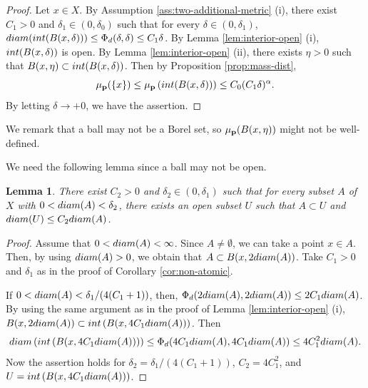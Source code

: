 \documentclass[10pt,a4paper]{amsart}
\newtheorem{Lem}[Thm]{Lemma}
\begin{document}
\begin{proof}
Let $x \in X$. 
By Assumption \ref{ass:two-additional-metric} (i), 
there exist $C_1 > 0$ and $\delta_1 \in (0, \delta_0)$ such that for every $\delta \in (0, \delta_1)$, 
$\textup{diam}(\textup{int}(B(x,\delta))) \le \Phi_d (\delta, \delta) \le C_1 \delta$. 
By Lemma \ref{lem:interior-open} (i), $\textup{int}(B(x,\delta))$ is open.
By Lemma \ref{lem:interior-open} (ii), there exists $\eta > 0$ such that $B(x,\eta) \subset \textup{int}(B(x,\delta))$. 
Then by Proposition \ref{prop:mass-dist}, 
\[ \mu_{\bf p}(\{x\}) \le \mu_{\bf p} \left( \textup{int}(B(x,\delta)) \right) \le C_0 (C_1 \delta)^{\alpha}.   \]
By letting $\delta \to +0$, we have the assertion. 
\end{proof}

We remark that a ball may not be a Borel set, so $\mu_{\bf p}(B(x,\eta))$ might not be well-defined. 

We need the following lemma since a ball may not be open. 

\begin{Lem}\label{lem:large-open}
There exist $C_2 > 0$ and $\delta_2 \in (0, \delta_1)$  such that for every subset $A$ of $X$ with $0 < \textup{diam}(A) < \delta_2$, 
there exists an open subset $U$ such that $A \subset U$ and $ \textup{diam}(U) \le C_2 \textup{diam}(A)$. 
\end{Lem}

\begin{proof}
Assume that $0 < \textup{diam}(A) < \infty$. 
Since $A \ne \emptyset$, we can take a point $x \in A$. 
Then, by using $\textup{diam}(A) > 0$, we obtain that $A \subset B(x, 2\textup{diam}(A))$. 
Take $C_1 > 0$ and $\delta_1$ as in the proof of Corollary \ref{cor:non-atomic}. 

If $0 < \textup{diam}(A) < \delta_1 / (4(C_1 + 1))$, then, $\Phi_d (2\textup{diam}(A), 2\textup{diam}(A)) \le 2C_1 \textup{diam}(A)$. 
By using the same argument as in the proof of Lemma \ref{lem:interior-open} (i), 
$B(x, 2\textup{diam}(A)) \subset \textup{int} \left(B(x, 4C_1 \textup{diam}(A)) \right)$. 
Then 
\[ \textup{diam}\left(  \textup{int} \left(B(x, 4C_1 \textup{diam}(A)) \right) \right) \le \Phi_d (4C_1 \textup{diam}(A),  4C_1 \textup{diam}(A)) \le 4C_1^2 \textup{diam}(A). \]
Now the assertion holds for $\delta_2 =  \delta_1 / (4(C_1 + 1))$, $C_2 = 4C_1^2$, and $U =  \textup{int} \left(B(x, 4C_1 \textup{diam}(A)) \right)$. 
\end{proof}
\end{document}
